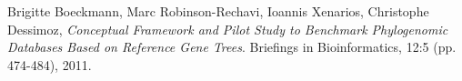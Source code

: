\documentclass[a4paper,11pt]{article}
\begin{document}
\begin{thebibliography}{9}

  Brigitte Boeckmann, Marc Robinson-Rechavi, Ioannis Xenarios, Christophe Dessimoz, 
  \emph{Conceptual Framework and Pilot Study to Benchmark Phylogenomic Databases Based 
  on Reference Gene Trees}. 
  Briefings in Bioinformatics, 12:5 (pp. 474-484), 
  2011.

\end{thebibliography}
\end{document}
